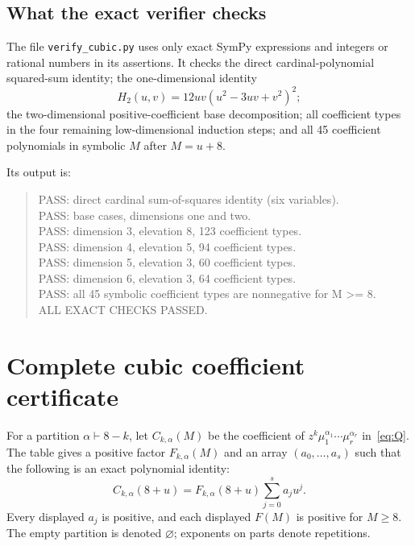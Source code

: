 \documentclass[11pt,a4paper]{article}
\theoremstyle{remark}
\begin{document}
\subsection{What the exact verifier checks}

The file \texttt{verify\_cubic.py} uses only exact SymPy expressions and integers or rational numbers in its assertions. It checks the direct cardinal-polynomial squared-sum identity; the one-dimensional identity
\[
 H_2(u,v)=12uv(u^2-3uv+v^2)^2;
\]
the two-dimensional positive-coefficient base decomposition; all coefficient types in the four remaining low-dimensional induction steps; and all 45 coefficient polynomials in symbolic $M$ after $M=u+8$.

Its output is:
\begin{quote}\ttfamily\small
PASS: direct cardinal sum-of-squares identity (six variables).\\
PASS: base cases, dimensions one and two.\\
PASS: dimension 3, elevation 8, 123 coefficient types.\\
PASS: dimension 4, elevation 5, 94 coefficient types.\\
PASS: dimension 5, elevation 3, 60 coefficient types.\\
PASS: dimension 6, elevation 3, 64 coefficient types.\\
PASS: all 45 symbolic coefficient types are nonnegative for M >= 8.\\
ALL EXACT CHECKS PASSED.
\end{quote}

\newpage
\appendix
\section{Complete cubic coefficient certificate}\label{app:certificate}

For a partition $\alpha\vdash8-k$, let $C_{k,\alpha}(M)$ be the coefficient of $z^k\mu_1^{\alpha_1}\cdots\mu_r^{\alpha_r}$ in~\eqref{eq:Q}. The table gives a positive factor $F_{k,\alpha}(M)$ and an array $(a_0,\ldots,a_s)$ such that the following is an exact polynomial identity:
\begin{equation}\label{eq:tablemeaning}
 C_{k,\alpha}(8+u)=F_{k,\alpha}(8+u)\sum_{j=0}^s a_j u^j.
\end{equation}
Every displayed $a_j$ is positive, and each displayed $F(M)$ is positive for $M\ge8$. The empty partition is denoted $\varnothing$; exponents on parts denote repetitions.
\end{document}
